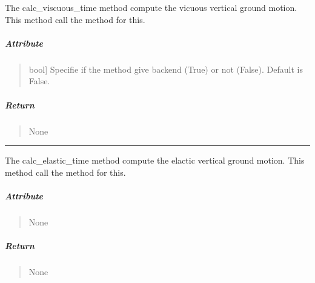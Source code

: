 \documentclass[letterpaper,10pt,english]{sphinxmanual}
\begin{document}
\begin{fulllineitems}
\label{\detokenize{GRID_doc/LOAD_TIME_GRID_doc:SL_C0de.grid.LOAD_TIME_GRID.calc_viscuous_time}}
\pysigstartsignatures
{}
\pysigstopsignatures
\sphinxAtStartPar
The \label{\detokenize{GRID_doc/LOAD_TIME_GRID_doc:calc-viscuous-time}}calc\_viscuous\_time method compute the vicuous vertical ground motion. This method call the  method for this.


\subparagraph{Attribute}
\label{\detokenize{GRID_doc/LOAD_TIME_GRID_doc:id3}}\begin{quote}
\begin{description}
\sphinxlineitem{backend}{[}bool{]}
\sphinxAtStartPar
Specifie if the method give backend (True) or not (False). Default is False.

\end{description}
\end{quote}


\subparagraph{Return}
\label{\detokenize{GRID_doc/LOAD_TIME_GRID_doc:return}}\begin{quote}

\sphinxAtStartPar
None
\end{quote}

\end{fulllineitems}



\bigskip\hrule\bigskip


\begin{fulllineitems}
\label{\detokenize{GRID_doc/LOAD_TIME_GRID_doc:SL_C0de.grid.LOAD_TIME_GRID.calc_elastic_time}}
\pysigstartsignatures
{}
\pysigstopsignatures
\sphinxAtStartPar
The \label{\detokenize{GRID_doc/LOAD_TIME_GRID_doc:calc-elastic-time}}calc\_elastic\_time method compute the elactic vertical ground motion. This method call the  method for this.


\subparagraph{Attribute}
\label{\detokenize{GRID_doc/LOAD_TIME_GRID_doc:id4}}\begin{quote}

\sphinxAtStartPar
None
\end{quote}


\subparagraph{Return}
\label{\detokenize{GRID_doc/LOAD_TIME_GRID_doc:id5}}\begin{quote}

\sphinxAtStartPar
None
\end{quote}

\end{fulllineitems}
\end{document}
